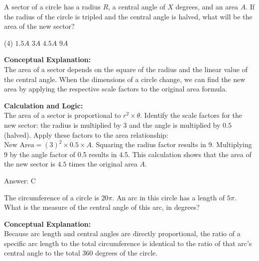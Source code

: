 \documentclass[11pt,paper=a4,answers]{exam}
\begin{document}
\begin{questions}
\vspace{60pt}

\question
A sector of a circle has a radius $R$, a central angle of $X$ degrees, and an area $A$. If the radius of the circle is tripled and the central angle is halved, what will be the area of the new sector?
\begin{tasks}(4)
    \task $1.5A$
    \task $3A$
    \task $4.5A$
    \task $9A$
\end{tasks}

\begin{solution}
\textbf{Conceptual Explanation:} \\
The area of a sector depends on the square of the radius and the linear value of the central angle. When the dimensions of a circle change, we can find the new area by applying the respective scale factors to the original area formula.

\vspace{30pt}

\textbf{Calculation and Logic:} \\
The area of a sector is proportional to $r^2 \times \theta$. Identify the scale factors for the new sector: the radius is multiplied by 3 and the angle is multiplied by $0.5$ (halved). Apply these factors to the area relationship: $\text{New Area} = (3)^2 \times 0.5 \times A$. Squaring the radius factor results in 9. Multiplying 9 by the angle factor of 0.5 results in 4.5. This calculation shows that the area of the new sector is $4.5$ times the original area $A$.

\vspace{30pt}

Answer: \colorbox{yellow!100}{C}
\end{solution}

\vspace{60pt}

\question
The circumference of a circle is $20\pi$. An arc in this circle has a length of $5\pi$. What is the measure of the central angle of this arc, in degrees?

\begin{solution}
\textbf{Conceptual Explanation:} \\
Because arc length and central angles are directly proportional, the ratio of a specific arc length to the total circumference is identical to the ratio of that arc's central angle to the total 360 degrees of the circle.


\end{solution}
\end{questions}
\end{document}
